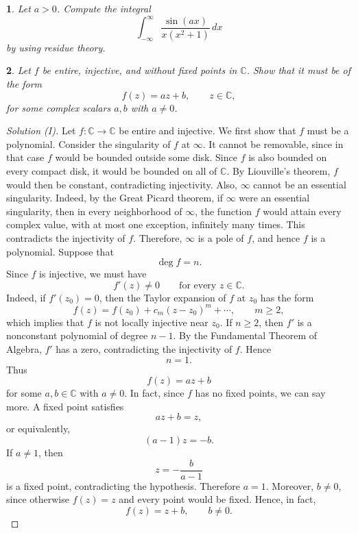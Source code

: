 \documentclass[12pt, a4paper]{report}
\theoremstyle{spaced}
\newtheorem{exercise}{}
\begin{document}
\begin{exercise}
	Let \(a>0\). Compute the integral
	\[
		\int_{-\infty}^{\infty}\frac{\sin(ax)}{x(x^2+1)}\,dx
	\]
	by using residue theory.
\end{exercise}

\begin{exercise}
	Let \(f\) be entire, injective, and without fixed points in \(\mathbb{C}\).
	Show that it must be of the form
	\[
		f(z)=az+b,
		\qquad z\in\mathbb{C},
	\]
	for some complex scalars \(a,b\) with \(a\neq 0\).
\end{exercise}
\begin{proof}[Solution (I)]
	Let $f:\mathbb{C}\to\mathbb{C}$ be entire and injective. We first show that
	$f$ must be a polynomial.
	Consider the singularity of $f$ at $\infty$. It cannot be removable, since
	in that case $f$ would be bounded outside some disk. Since $f$ is also
	bounded on every compact disk, it would be bounded on all of $\mathbb{C}$.
	By Liouville's theorem, $f$ would then be constant, contradicting
	injectivity.
	Also, $\infty$ cannot be an essential singularity. Indeed, by the Great
	Picard theorem, if $\infty$ were an essential singularity, then in every
	neighborhood of $\infty$, the function $f$ would attain every complex value,
	with at most one exception, infinitely many times. This contradicts the
	injectivity of $f$.
	Therefore, $\infty$ is a pole of $f$, and hence $f$ is a polynomial.
	Suppose that
	\[
		\deg f=n.
	\]
	Since $f$ is injective, we must have
	\[
		f'(z)\neq 0
		\qquad\text{for every } z\in\mathbb{C}.
	\]
	Indeed, if $f'(z_0)=0$, then the Taylor expansion of $f$ at $z_0$ has the
	form
	\[
		f(z)=f(z_0)+c_m(z-z_0)^m+\cdots,
		\qquad m\geq 2,
	\]
	which implies that $f$ is not locally injective near $z_0$.
	If $n\geq 2$, then $f'$ is a nonconstant polynomial of degree $n-1$.
	By the Fundamental Theorem of Algebra, $f'$ has a zero, contradicting the
	injectivity of $f$. Hence
	\[
		n=1.
	\]
	Thus
	\[
		f(z)=az+b
	\]
	for some $a,b\in\mathbb{C}$ with $a\neq 0$.
	In fact, since $f$ has no fixed points, we can say more. A fixed point
	satisfies
	\[
		az+b=z,
	\]
	or equivalently,
	\[
		(a-1)z=-b.
	\]
	If $a\neq 1$, then
	\[
		z=-\frac{b}{a-1}
	\]
	is a fixed point, contradicting the hypothesis. Therefore $a=1$.
	Moreover, $b\neq 0$, since otherwise $f(z)=z$ and every point would be
	fixed. Hence, in fact,
	\[
		f(z)=z+b,
		\qquad b\neq 0.
	\]

\end{proof}
\end{document}

